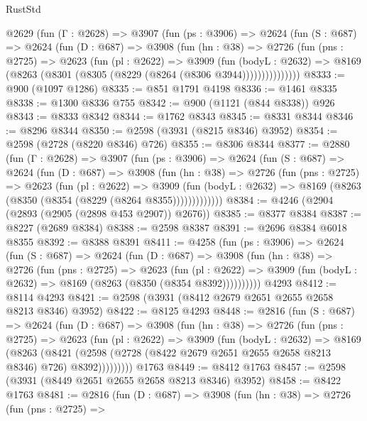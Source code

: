 \begin{lexlean}{RustStd}
\begin{coremodule}
    @2629
      (fun (Γ : @2628) =>
      @3907
        (fun (ps : @3906) =>
        @2624
          (fun (S : @687) =>
          @2624
            (fun (D : @687) =>
            @3908
              (fun (hn : @38) =>
              @2726
                (fun (pns : @2725) =>
                @2623
                  (fun (pl : @2622) =>
                  @3909
                    (fun (bodyL : @2632) =>
                    @8169 (@8263 (@8301 (@8305 (@8229 (@8264 (@8306 @3944)))))))))))))))
@8333 := @900 (@1097 @1286)
@8335 := @851 @1791 @4198
@8336 := @1461 @8335
@8338 := @1300 @8336 @755
@8342 := @900 (@1121 (@844 @8338)) @926
@8343 := @8333 @8342
@8344 := @1762 @8343
@8345 := @8331 @8344
@8346 := @8296 @8344
@8350 := @2598 (@3931 (@8215 @8346) @3952)
@8354 := @2598 (@2728 (@8220 @8346) @726)
@8355 := @8306 @8344
@8377 := @2880
    (fun (Γ : @2628) =>
    @3907
      (fun (ps : @3906) =>
      @2624
        (fun (S : @687) =>
        @2624
          (fun (D : @687) =>
          @3908
            (fun (hn : @38) =>
            @2726
              (fun (pns : @2725) =>
              @2623
                (fun (pl : @2622) =>
                @3909
                  (fun (bodyL : @2632) =>
                  @8169 (@8263 (@8350 (@8354 (@8229 (@8264 @8355)))))))))))))
@8384 := @4246 (@2904 (@2893 (@2905 (@2898 @453 @2907)) @2676))
@8385 := @8377 @8384
@8387 := @8227 (@2689 @8384)
@8388 := @2598 @8387
@8391 := @2696 @8384 @6018 @8355
@8392 := @8388 @8391
@8411 := @4258
    (fun (ps : @3906) =>
    @2624
      (fun (S : @687) =>
      @2624
        (fun (D : @687) =>
        @3908
          (fun (hn : @38) =>
          @2726
            (fun (pns : @2725) =>
            @2623
              (fun (pl : @2622) =>
              @3909 (fun (bodyL : @2632) => @8169 (@8263 (@8350 (@8354 @8392))))))))))
    @4293
@8412 := @8114 @4293
@8421 := @2598 (@3931 (@8412 @2679 @2651 @2655 @2658 @8213 @8346) @3952)
@8422 := @8125 @4293
@8448 := @2816
    (fun (S : @687) =>
    @2624
      (fun (D : @687) =>
      @3908
        (fun (hn : @38) =>
        @2726
          (fun (pns : @2725) =>
          @2623
            (fun (pl : @2622) =>
            @3909
              (fun (bodyL : @2632) =>
              @8169
                (@8263
                  (@8421
                    (@2598 (@2728 (@8422 @2679 @2651 @2655 @2658 @8213 @8346) @726) @8392)))))))))
    @1763
@8449 := @8412 @1763
@8457 := @2598 (@3931 (@8449 @2651 @2655 @2658 @8213 @8346) @3952)
@8458 := @8422 @1763
@8481 := @2816
    (fun (D : @687) =>
    @3908
      (fun (hn : @38) =>
      @2726
        (fun (pns : @2725) =>

\end{coremodule}
\end{lexlean}
